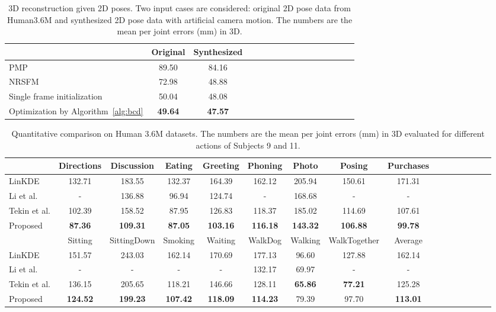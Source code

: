 \documentclass[10pt,twocolumn,letterpaper]{article}
\newcommand{\refAlg}[1]{Algorithm~\ref{#1}}
\begin{document}
{\begin{table}
\centering
\renewcommand{\arraystretch}{1.2}
\begin{tabular}{l*{15}{c}}
\toprule
 & Original & Synthesized \\
\toprule
PMP \cite{ramakrishna2012reconstructing} & 89.50 & 84.16 \\
NRSFM \cite{dai2012simple} & 72.98 & 48.88 \\
Single frame initialization & 50.04 & 48.08 \\
Optimization by \refAlg{alg:bcd} & \textbf{49.64} & \textbf{47.57} \\
\toprule
\end{tabular}
\vspace{0.25em}
\caption{3D reconstruction given 2D poses. Two input cases are considered: original 2D pose data from Human3.6M and synthesized 2D pose data with artificial camera motion. The numbers are the mean per joint errors (mm) in 3D. }\label{tab:nrsfm}
\vspace{-1em}
\end{table}

\begin{table*}
\renewcommand{\arraystretch}{1.2}
\begin{tabular}{l*{15}{c}}
\toprule
 & Directions & Discussion & Eating & Greeting & Phoning & Photo & Posing & Purchases \\
\toprule
LinKDE \cite{ionescu2014human} & 132.71 & 183.55 & 132.37 & 164.39 & 162.12 & 205.94 & 150.61 & 171.31 \\
Li et al. \cite{li2015maximum} & - & 136.88 & 96.94 & 124.74 & - & 168.68 & - & - \\
Tekin et al. \cite{tekin2015predicting} & 102.39 & 158.52 & 87.95 & 126.83 & 118.37 & 185.02 & 114.69 & 107.61 \\
Proposed & \textbf{87.36} & \textbf{109.31} & \textbf{87.05} & \textbf{103.16} & \textbf{116.18} &  \textbf{143.32} & \textbf{106.88} & \textbf{99.78} \\
\toprule
 & Sitting & SittingDown & Smoking & Waiting & WalkDog & Walking & WalkTogether & Average \\
\toprule
LinKDE \cite{ionescu2014human} & 151.57 & 243.03 & 162.14 & 170.69 & 177.13 & 96.60 & 127.88 & 162.14  \\
Li et al. \cite{li2015maximum} & - & - & - & - & 132.17 & 69.97 & - & - \\
Tekin et al. \cite{tekin2015predicting} & 136.15 & 205.65 & 118.21 & 146.66 & 128.11 & \textbf{65.86} & \textbf{77.21} & 125.28  \\
Proposed & \textbf{124.52} & \textbf{199.23} & \textbf{107.42} & \textbf{118.09} & \textbf{114.23} & 79.39 & 97.70 & \textbf{113.01} \\
\toprule
\end{tabular}
\vspace{0.25em}
\caption{Quantitative comparison on Human 3.6M datasets. The numbers are the mean per joint errors (mm) in 3D evaluated for different actions of Subjects 9 and 11. }\label{tab:h36m}
\vspace{-1em}
\end{table*}

}
\end{document}
